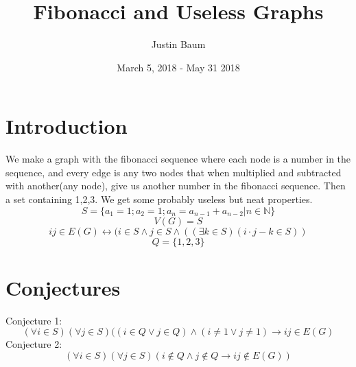 \documentclass{article}
\title{Fibonacci and Useless Graphs}
\author{Justin Baum}
\date{March 5, 2018 - May 31 2018}
\begin{document}
\maketitle

\section{Introduction}
We make a graph with the fibonacci sequence where each node is a number in the sequence, and every edge is any two nodes that when multiplied and subtracted with another(any node), give us another number in the fibonacci sequence. Then a set containing 1,2,3. We get some probably useless but neat properties.
\[S=\{a_{1}=1;a_{2}=1; a_{n}=a_{n-1}+a_{n-2}|n\in \mathbb{N}\}\]
\[V(G)=S\]
\[ij\in E(G)\leftrightarrow (i \in S \wedge j \in S \wedge ((\exists k \in S)(i\cdot j-k\in S))\]
\[Q=\{1,2,3\}\]
\section{Conjectures}
Conjecture 1: \[(\forall i \in S)(\forall j \in S)((i\in Q \vee j\in Q) \wedge (i \neq 1 \vee j \neq 1) \rightarrow ij \in E(G)\]
Conjecture 2: \[(\forall i \in S)(\forall j \in S)(i\notin Q \wedge j\notin Q \rightarrow ij \notin E(G))\]
\end{document}
